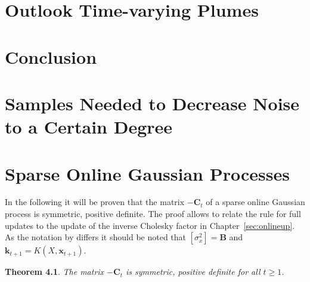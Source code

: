 \documentclass[11pt,a4paper,twoside,BCOR=15mm]{scrbook}
\newtheorem{theorem}{Theorem}
\newcommand{\vc}[1]{\bm{#1}}
\newcommand{\mat}[1]{\bm{#1}}
\begin{document}
\tableofcontents


\printglossary[title={Symbols and Notation}]

\printglossary[type=\acronymtype]

\mainmatter{}







\chapter{Outlook Time-varying Plumes}

\chapter{Conclusion}

\appendix
\chapter{Samples Needed to Decrease Noise to a Certain 
    Degree}\label{sec:decnoise}

\chapter{Sparse Online Gaussian Processes}\label{sec:sparse-gp-apdx}
In the following it will be proven that the matrix $-\mat C_t$ of a sparse 
online Gaussian process \parencite{Csato:2002fp} is symmetric, positive 
definite. The proof allows to relate the rule for full updates to the update of 
the inverse Cholesky factor in Chapter~\ref{sec:onlineup}. As the notation by 
\textcite{Csato:2002fp} differs it should be noted that $[\sigma_x^2] = \mat B$ 
and $\vc k_{t+1} = K(X, {\vc x_{t+1}})$.

\begin{theorem}
    The matrix $-\mat C_t$ is symmetric, positive definite for all $t \geq 1$.
\end{theorem}
\end{document}
